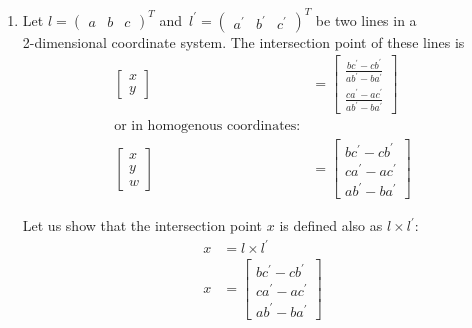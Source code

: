\documentclass[11pt,a4paper]{article}
\begin{document}
\begin{enumerate}
\begin{enumerate}
                  \item Let $l = \begin{pmatrix}
                                    a & b & c
                              \end{pmatrix}^T$ and $l^\prime = \begin{pmatrix}
                                    a^\prime & b^\prime & c^\prime
                              \end{pmatrix}^T$ be two lines in a \\ 2-dimensional coordinate system. The intersection point of these lines is
                        \begin{align*}
                              \begin{bmatrix}
                                    x \\ y
                              \end{bmatrix} & = \begin{bmatrix}
                                                      \frac{b c^\prime - c b^\prime}{a b^\prime - b a^\prime} \\
                                                      \frac{c a^\prime - a c^\prime}{a b^\prime - b a^\prime}
                                                \end{bmatrix}                      \\
                              \text{or in homogenous coordinates:}                                                           \\
                              \begin{bmatrix}
                                    x \\ y \\ w
                              \end{bmatrix} & = \begin{bmatrix}
                                                      b c^\prime - c b^\prime \\ c a^\prime - a c^\prime \\ a b^\prime - b a^\prime
                                                \end{bmatrix}
                        \end{align*}

                        Let us show that the intersection point $x$ is defined also as $l \times l^\prime$:
                        \begin{align*}
                              x & = l \times l^\prime                                                            \\
                              x & = \begin{bmatrix}
                                          b c^\prime - c b^\prime \\ c a^\prime - a c^\prime \\ a b^\prime - b a^\prime
                                    \end{bmatrix}
                        \end{align*}


\end{enumerate}
\end{enumerate}
\end{document}
